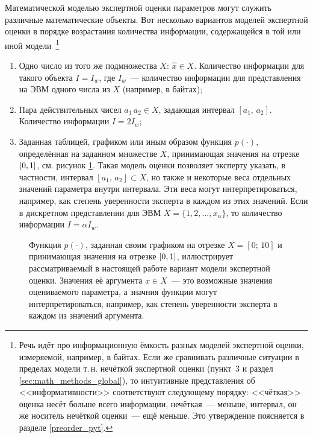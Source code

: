 Математической моделью экспертной оценки параметров могут служить различные математические объекты. Вот несколько вариантов моделей экспертной оценки в порядке возрастания количества информации, содержащейся в той или иной модели~\footnote{Речь идёт про информационную ёмкость разных моделей экспертной оценки, измеряемой, например, в байтах. Если же сравнивать различные ситуации в пределах модели т.\,н. нечёткой экспертной оценки (пункт~3 и раздел \ref{sec:math_methods_global}), то интуитивные представления об <<информативности>> соответствуют следующему порядку: <<чёткая>> оценка несёт больше всего информации, нечёткая~--- меньше, интервал, он же носитель нечёткой оценки~--- ещё меньше. Это утверждение поясняется в разделе \ref{preorder_pyt}. } 
\begin{enumerate}
  \item Одно число из того же подмножества $X$: $\hat{x} \in X$. Количество информации для такого объекта $I = I_w$, где $I_w$~--- количество информации для представления на ЭВМ одного числа из $X$ (например, в байтах);
  \item Пара действительных чисел $a_1\, a_2 \in X$, задающая интервал $[a_1,\, a_2]$. Количество информации $I = 2I_w$;
  \item Заданная таблицей, графиком или иным образом функция $p(\cdot)$, определённая на заданном множестве $X$, принимающая значения на отрезке $[0,1]$, см. рисунок \ref{ris:fuzzy_number_intro}. Такая модель оценки позволяет эксперту указать, в частности, интервал $[a_1,\, a_2] \subset X$, но также и некоторые веса отдельных значений параметра внутри интервала. Эти веса могут интерпретироваться, например, как степень уверенности эксперта в каждом из этих значений. Если в дискретном представлении для ЭВМ $X = \{1, 2, ..., x_{\alpha}\}$, то количество информации $I = \alpha I_w$. 
\end{enumerate}

\begin{figure}[h!]
\caption{\small Функция $p(\cdot)$, заданная своим графиком на отрезке $X = [0;\,10]$ и принимающая значения на отрезке $[0,1]$, иллюстрирует рассматриваемый в настоящей работе вариант модели экспертной оценки. Значения её аргумента $x \in X$~--- это возможные значения оцениваемого параметра, а значния функции могут интерпретироваться, например, как степень уверенности эксперта в каждом из значений аргумента. }
\label{ris:fuzzy_number_intro}
\end{figure}

